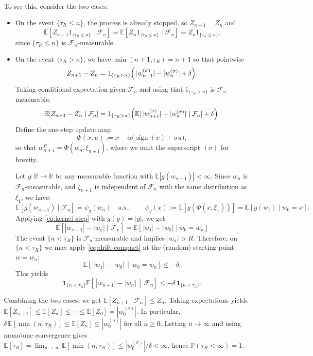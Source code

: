 \documentclass{article}
\theoremstyle{plain}
\theoremstyle{definition}
\theoremstyle{remark}
\newcommand{\R}{\mathbb{R}}
\newcommand{\E}{\mathbb{E}}
\newcommand{\PP}{\mathbb{P}}
\newcommand{\cF}{\mathcal{F}}
\newcommand{\stepsize}{\alpha}
\newcommand{\sign}{\operatorname{sign}}
\begin{document}
To see this, consider the two cases:
\begin{itemize}
  \item On the event $\{\tau_R\le n\}$, the process is already stopped, so $Z_{n+1}=Z_n$ 
  and 
  \[
  \E\!\left[ Z_{n+1} 1_{\{\tau_R\le n\}} \mid \cF_n\right] = \E\!\left[ Z_{n} 1_{\{\tau_R\le n\}} \mid \cF_n\right] = Z_n 1_{\{\tau_R\le n\}}.
    \] 
  since $\{\tau_R \le n\}$ is $\cF_n$-measurable. 
  \item On the event $\{\tau_R> n\}$, we have $\min(n+1,\tau_R)=n+1$ 
  so that pointwise
  \[
  Z_{n+1}-Z_n = 1_{\{\tau_R> n\}} \Bigl(\,|w_{n+1}^{(\sigma)}|-|w_n^{(\sigma)}|+\delta\Bigr).
  \]
  Taking conditional expectation given $\cF_n$ and using that $1_{\{\tau_R> n\}}$ is $\cF_n$-measurable,
  \[
\E[Z_{n+1}-Z_n\mid \cF_n]
=
1_{\{\tau_R> n\}} \Bigl(\E[\,|w_{n+1}^{(\sigma)}|-|w_n^{(\sigma)}| \mid \cF_n] + \delta\Bigr).
  \]
  Define the one-step update map
\[
\Phi(x,u) := x - \stepsize\bigl(\sign(x)+\sigma u\bigr),
\]
so that $w_{n+1}^P=\Phi(w_n,\xi_{n+1})$, where we omit the superscript $(\sigma)$ for brevity. 

Let $g:\R\to\R$ be any measurable function with $\E|g(w_{n+1})|<\infty$.
Since $w_n$ is $\cF_n$-measurable, and $\xi_{n+1}$ is independent of $\cF_n$ with the same distribution as $\xi_1$,
we have:
\begin{equation}
\label{eq:kernel-step}
\E\!\left[g(w_{n+1})\mid \cF_n\right]
=
\psi_g(w_n)
\quad\text{a.s.},
\qquad
\psi_g(x):=\E\!\left[g(\Phi(x,\xi_1))\right] = \E\!\left[g(w_1)\mid w_0=x\right].
\end{equation}
Applying \eqref{eq:kernel-step} with $g(y)=|y|$, we get
\[
\E\!\left[|w_{n+1}|-|w_n|\mid \cF_n\right]
=
\E\!\left[|w_{1}| -|w_0|\mid w_0=w_n\right]
\]
The event $\{n<\tau_R\}$ is $\cF_n$-measurable and implies $|w_n|>R$.
Therefore, on $\{n<\tau_R\}$ we may apply \eqref{eq:drift-compact} at the (random) starting point $w=w_n$:
\[
\E\!\left[\,|w_1|-|w_0| \,\middle|\, w_0=w_n\right] \le -\delta.
\]
This yields
\[
\mathbf 1_{\{n<\tau_R\}}\E\!\left[\,|w_{n+1}|-|w_n| \,\middle|\, \cF_n\right]
\le
-\delta\,\mathbf 1_{\{n<\tau_R\}}.
\]
\end{itemize}
Combining the two cases, we get $\E\!\left[ Z_{n+1}\mid \cF_n\right]\le Z_n$. 
Taking expectations yields $\E[Z_{n+1}]\le \E[Z_n]\le \cdots \le \E[Z_0] = |w_0^{(\sigma)}|$.
In particular, $\delta\,\E[\min(n,\tau_R)]\le \E[Z_n]\le |w_0^{(\sigma)}|$ for all $n\ge0$. 
Letting $n\to\infty$ and using monotone convergence gives 
$\E[\tau_R] = \lim_{n\to\infty} \E[ \min(n,\tau_R)]
\le |w_0^{(\sigma)}|/\delta<\infty$,
hence $\PP(\tau_R<\infty)=1$. 
\end{document}

